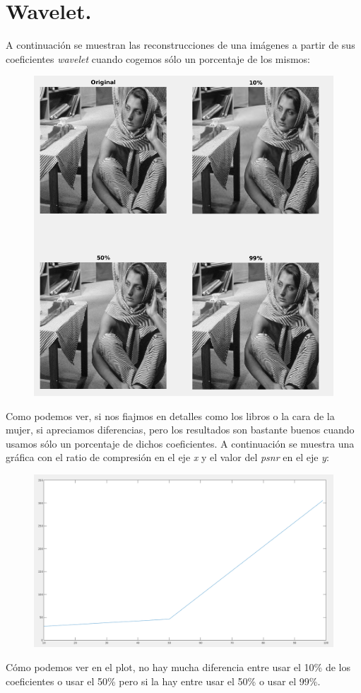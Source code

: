 \documentclass[12pt]{article}
\begin{document}
\section{Wavelet.}

A continuación se muestran las reconstrucciones de una imágenes a partir de sus coeficientes \textit{wavelet} cuando cogemos sólo un porcentaje de los mismos:

\begin{figure}[H]
	\centering
	\includegraphics[width=0.8\linewidth]{images/wavelet.png}\\
\end{figure}

Como podemos ver, si nos fiajmos en detalles como los libros o la cara de la mujer, si apreciamos diferencias, pero los resultados son bastante buenos cuando usamos sólo un porcentaje de dichos coeficientes. A continuación se muestra una gráfica con el ratio de compresión en el eje \textit{x} y el valor del \textit{psnr} en el eje \textit{y}:

\begin{figure}[H]
\centering
\includegraphics[width=0.8\linewidth]{images/grafica.png}\\
\end{figure}

Cómo podemos ver en el plot, no hay mucha diferencia entre usar el 10\% de los coeficientes o usar el 50\% pero si la hay entre usar el 50\% o usar el 99\%.
\end{document}
